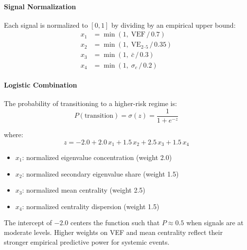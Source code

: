 \paragraph{Signal Normalization}

Each signal is normalized to $[0, 1]$ by dividing by an empirical upper bound:
\begin{align*}
x_1 &= \min\!\left(1,\; \text{VEF} \,/\, 0.7\right) \\
x_2 &= \min\!\left(1,\; \text{VE}_{2\text{--}5} \,/\, 0.35\right) \\
x_3 &= \min\!\left(1,\; \bar{c} \,/\, 0.3\right) \\
x_4 &= \min\!\left(1,\; \sigma_c \,/\, 0.2\right)
\end{align*}

\paragraph{Logistic Combination}

The probability of transitioning to a higher-risk regime is:
\[
P(\text{transition}) = \sigma(z) = \frac{1}{1 + e^{-z}}
\]

where:
\[
z = -2.0 + 2.0\,x_1 + 1.5\,x_2 + 2.5\,x_3 + 1.5\,x_4
\]

\begin{itemize}
  \item[] $x_1$: normalized eigenvalue concentration (weight 2.0)
  \item[] $x_2$: normalized secondary eigenvalue share (weight 1.5)
  \item[] $x_3$: normalized mean centrality (weight 2.5)
  \item[] $x_4$: normalized centrality dispersion (weight 1.5)
\end{itemize}

The intercept of $-2.0$ centers the function such that $P \approx 0.5$ when signals are at moderate levels. Higher weights on VEF and mean centrality reflect their stronger empirical predictive power for systemic events.
